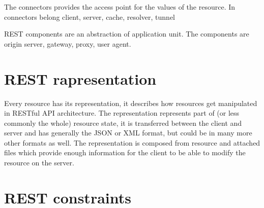 The connectors provides the access point for the values of the resource. In connectors belong client, server, cache, resolver, tunnel 

REST components are an abstraction of application unit. The components are origin server, gateway, proxy, user agent.


\section{REST rapresentation}
Every resource has its representation, it describes how resources get manipulated in RESTful  API architecture. The representation represents part of (or less commonly the whole) resource state, it is transferred between the client and server and has generally the JSON or XML format, but could be in many more other formats as well. The representation is composed from resource and attached files which provide enough information for the client to be able to modify the resource on the server.

\section{REST constraints}
\label{sec:constraints}

